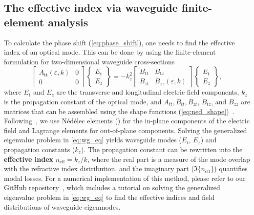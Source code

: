 \subsection*{The effective index via waveguide finite-element analysis}

To calculate the phase shift (\eqref{eq:phase_shift}), one needs to find the effective index of an optical mode. This can be done by 
using the finite-element formulation for two-dimensional waveguide cross-sections~\cite{jin}
\begin{equation}\label{eq:wg_eq}
 \left[\begin{array}{cc}
 A_{\text{tt}}(\varepsilon,k) & 0 \\
    0 & 0
    \end{array}\right]
 \left\{\begin{array}{l}
 E_{\text{t}} \\
 E_z
    \end{array}\right\}
 = -k_z^2
 \left[\begin{array}{cc}
 B_{\text{tt}} & B_{\text{t} z} \\
 B_{z \text{t}} & B_{z z}(\varepsilon,k)
    \end{array}\right]
 \left\{\begin{array}{c}
 E_{\text{t}} \\
 E_z
    \end{array}\right\},
    \end{equation}
where $E_{\text{t}}$ and $E_z$ are the transverse and longitudinal electric field components, $k_z$ is the propagation constant of the optical mode, and $A_{tt}, B_{tt},
B_{zt}$, $B_{tz}$, and $B_{zz}$ are matrices that can be assembled using the shape functions (\eqref{eq:ned_shape})~\cite{jin}. Following~\cite{jin}, we use Nédélec elements () for the in-plane components of the electric field and 
Lagrange elements for out-of-plane components. 
Solving the generalized eigenvalue problem in \eqref{eq:wg_eq} yields waveguide modes ($E_t$, $E_z$) and propagation constants ($k_z$). The propagation constant can be rewritten into the \textbf{effective index} $n_\text{eff} = k_z / k$,
 where the real part is a measure of the mode overlap with the refractive index distribution, and the imaginary part ($\Im\{n_\text{eff}\}$) quantifies modal losses. For a numerical implementation of this method, please refer to our GitHub repository~\cite{FEWEC}, which includes a tutorial on solving the 
 generalized eigenvalue problem in \eqref{eq:wg_eq} to find the effective indices and field distributions of waveguide eigenmodes.

